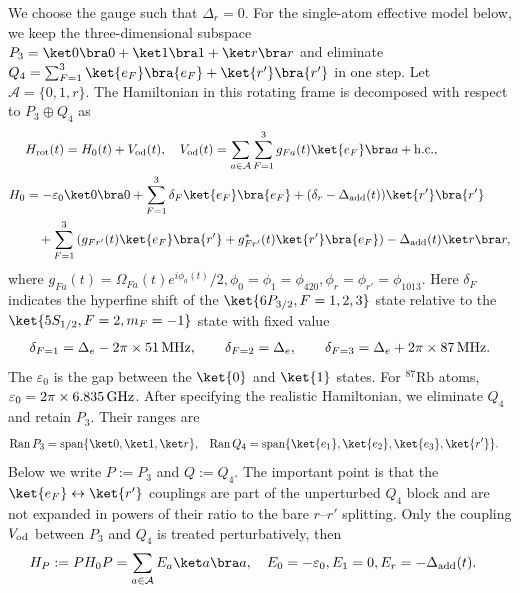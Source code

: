 We choose the gauge such that $\Delta_r = 0$.
For the single-atom effective model below, we keep the three-dimensional
subspace
$P_3=\ket0\bra0+\ket1\bra1+\ket r\bra r$ and eliminate
$Q_4=\sum_{F=1}^3\ket{e_F}\bra{e_F}+\ket{r'}\bra{r'}$ in one step.
Let $\mathcal A=\{0,1,r\}$.
The Hamiltonian in this rotating frame is decomposed with respect to $P_3\oplus Q_4$ as
\begin{align}
&H_{\rm rot}(t)
=H_0(t) +V_{\rm od}(t), \quad V_{\rm od}(t)=\sum_{a\in\mathcal A}\sum_{F=1}^3g_{Fa}(t)\ket{e_F}\bra a + \mathrm{h.c.},\label{eq:7level_Vod}\\
H_0&=-\varepsilon_0\ket0\bra0
+\sum_{F=1}^3\delta_F\ket{e_F}\bra{e_F}
+ (\delta_r - \Delta_{\mathrm{add}}(t))\ket{r'}\bra{r'} \\
&\quad + \sum_{F=1}^3 \left(g_{Fr'}(t)\ket{e_F}\bra{r'}+g_{Fr'}^*(t)\ket{r'}\bra{e_F}\right) -\Delta_{\mathrm{add}}(t) \ket r\bra r, \label{eq:7level_H0}
\end{align}
where $ g_{Fa}(t)={\Omega_{Fa}(t)e^{i\phi_a(t)}}/{2}, \phi_0=\phi_1=\phi_{\mathrm{420}},\phi_r=\phi_{r'}=\phi_{\mathrm{1013}}$.
Here $\delta_F$ indicates the hyperfine shift of the $\ket{6P_{3/2},F= 1,2,3}$ state relative to the $\ket{5S_{1/2},F=2,m_F=-1}$ state with fixed value
\begin{align}
\delta_{F = 1}=\Delta_e - 2\pi\times 51\,{\rm MHz},\qquad
\delta_{F = 2}=\Delta_e,\qquad
\delta_{F = 3}=\Delta_e + 2\pi\times 87\,{\rm MHz}.
\end{align}
The $\varepsilon_0$ is the gap between the $\ket{0}$ and $\ket{1}$ states. For $^{87}\mathrm{Rb}$ atoms, $\varepsilon_0 = 2\pi \times  6.835\,{\rm GHz}$.
After specifying the realistic Hamiltonian, we eliminate $Q_4$ and retain
$P_3$.  Their ranges are
\begin{align}
\operatorname{Ran}P_3
&=\operatorname{span}\{\ket0,\ket1,\ket r\},&
\operatorname{Ran}Q_4
&=\operatorname{span}\{\ket{e_1},\ket{e_2},\ket{e_3},\ket{r'}\}.
\end{align}
Below we write $P:=P_3$ and $Q:=Q_4$.
The important point is that the $\ket{e_F}\leftrightarrow\ket{r'}$ couplings
are part of the unperturbed $Q_4$ block and are not expanded in powers of
their ratio to the bare $r$--$r'$ splitting.  Only the coupling $V_{\rm od}$
between $P_3$ and $Q_4$ is treated perturbatively, then
\begin{align}
H_P:=PH_0P&=\sum_{a\in\mathcal A}E_a\ket a\bra a,
\quad 
E_0=-\varepsilon_0,
E_1=0,
E_r=-\Delta_{\rm add}(t).
\label{eq:P3_bare_energies}
\end{align}
